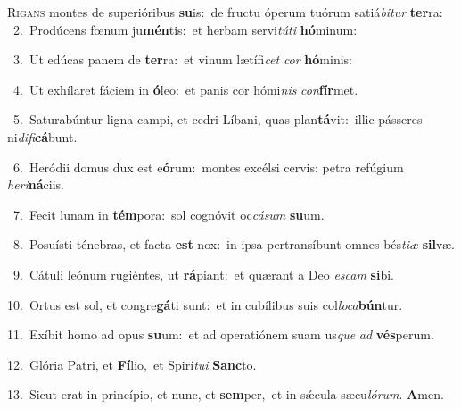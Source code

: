 \lettrine{\initial\textcolor{\initialcolor}{R}}{igans} montes de superióribus \textbf{su}\-is:~\star de fructu óperum tuórum satiá\-\textit{bi}\-\textit{tur} \textbf{ter}\-ra:\\
{\numbfont\textcolor{\numbcolor}{~2.}}~Prodúcens fœnum ju\-\textbf{mén}\-tis:~\star et herbam servi\-\textit{tú}\-\textit{ti} \textbf{hó}\-minum:\par
{\numbfont\textcolor{\numbcolor}{~3.}}~Ut edúcas panem de \textbf{ter}\-ra:~\star et vinum lætífi\textit{cet} \textit{cor} \textbf{hó}\-minis:\par
{\numbfont\textcolor{\numbcolor}{~4.}}~Ut exhílaret fáciem in \textbf{ó}\-leo:~\star et panis cor hómi\textit{nis} \textit{con}\-\textbf{fír}met.\par
{\numbfont\textcolor{\numbcolor}{~5.}}~Saturabúntur ligna campi, et cedri Líbani, quas plan\-\textbf{tá}\-vit:~\star illic pásseres ni\-\textit{di}\-\textit{fi}\textbf{cá}bunt.\par
{\numbfont\textcolor{\numbcolor}{~6.}}~Heródii domus dux est e\-\textbf{ó}\-rum:~\star montes excélsi cervis: petra refúgium \textit{he}\-\textit{ri}\textbf{ná}ciis.\par
{\numbfont\textcolor{\numbcolor}{~7.}}~Fecit lunam in \textbf{tém}\-pora:~\star sol cognóvit oc\-\textit{cá}\-\textit{sum} \textbf{su}\-um.\par
{\numbfont\textcolor{\numbcolor}{~8.}}~Posuísti ténebras, et facta \textbf{est} nox:~\star in ipsa pertransíbunt omnes bés\-\textit{ti}\-\textit{æ} \textbf{sil}\-væ.\par
{\numbfont\textcolor{\numbcolor}{~9.}}~Cátuli leónum rugiéntes, ut \textbf{rá}\-piant:~\star et quærant a Deo \textit{es}\-\textit{cam} \textbf{si}\-bi.\par
{\numbfont\textcolor{\numbcolor}{10.}}~Ortus est sol, et congre\-\textbf{gá}\-ti sunt:~\star et in cubílibus suis col\-\textit{lo}\-\textit{ca}\textbf{bún}tur.\par
{\numbfont\textcolor{\numbcolor}{11.}}~Exíbit homo ad opus \textbf{su}\-um:~\star et ad operatiónem suam us\textit{que} \textit{ad} \textbf{vés}\-perum.\par
{\numbfont\textcolor{\numbcolor}{12.}}~Glória Patri, et \textbf{Fí}\-lio,~\star et Spirí\-\textit{tu}\-\textit{i} \textbf{Sanc}\-to.\par
{\numbfont\textcolor{\numbcolor}{13.}}~Sicut erat in princípio, et nunc, et \textbf{sem}\-per,~\star et in sǽcula sæcu\-\textit{ló}\-\textit{rum}. \textbf{A}\-men.\par
